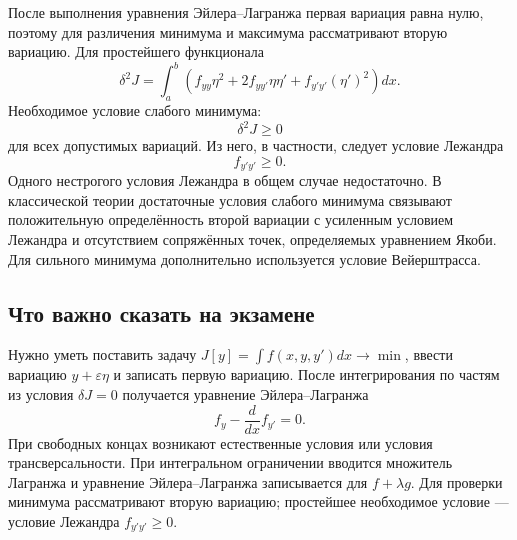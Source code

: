 После выполнения уравнения Эйлера--Лагранжа первая вариация равна нулю, поэтому
для различения минимума и максимума рассматривают вторую вариацию. Для
простейшего функционала
\[
    \delta^2J=\int_a^b
    \left(
        f_{yy}\eta^2
        +2f_{yy'}\eta\eta'
        +f_{y'y'}(\eta')^2
    \right)dx.
\]
Необходимое условие слабого минимума:
\[
    \delta^2J\geq0
\]
для всех допустимых вариаций. Из него, в частности, следует условие Лежандра
\[
    f_{y'y'}\geq0.
\]
Одного нестрогого условия Лежандра в общем случае недостаточно. В классической
теории достаточные условия слабого минимума связывают положительную
определённость второй вариации с усиленным условием Лежандра и отсутствием
сопряжённых точек, определяемых уравнением Якоби. Для сильного минимума
дополнительно используется условие Вейерштрасса.

\subsection{Что важно сказать на экзамене}

Нужно уметь поставить задачу
$J[y]=\int f(x,y,y')dx\to\min$, ввести вариацию
$y+\varepsilon\eta$ и записать первую вариацию. После интегрирования по частям
из условия $\delta J=0$ получается уравнение Эйлера--Лагранжа
\[
    f_y-\frac{d}{dx}f_{y'}=0.
\]
При свободных концах возникают естественные условия или условия
трансверсальности. При интегральном ограничении вводится множитель Лагранжа и
уравнение Эйлера--Лагранжа записывается для $f+\lambda g$. Для проверки
минимума рассматривают вторую вариацию; простейшее необходимое условие ---
условие Лежандра $f_{y'y'}\geq0$.

\newpage
